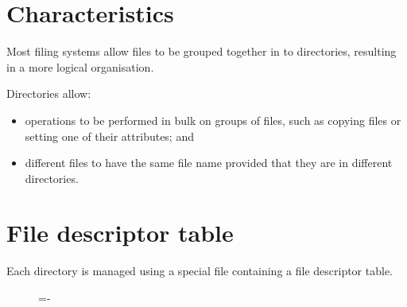 \documentclass[a4paper]{systems-software}
\begin{document}
\section*{Characteristics}

Most filing systems allow files to be grouped together in to directories, resulting in a more logical organisation.

Directories allow:
\begin{itemize}
	\item operations to be performed in bulk on groups of files, such as copying files or setting one of their attributes; and
	\item different files to have the same file name provided that they are in different directories.
\end{itemize}


\section*{File descriptor table}

Each directory is managed using a special file containing a file descriptor table.

\begin{figure}[H]
  \lineskip=-\fboxrule
\end{figure}
\end{document}
